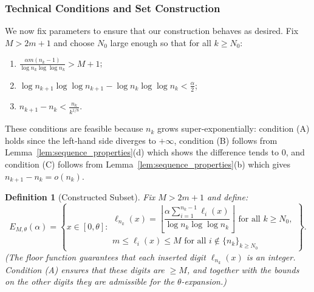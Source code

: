 \documentclass{article}
\newtheorem{definition}[theorem]{Definition}
\numberwithin{equation}{section}
\begin{document}
\subsubsection{Technical Conditions and Set Construction}
We now fix parameters to ensure that our construction behaves as desired. 
Fix $M > 2m+1$ and choose $N_0$ large enough so that for all $k \geq N_0$:
\begin{enumerate}
\item[(A)] $\displaystyle \frac{\alpha m(n_k - 1)}{\log n_k \log \log n_k} > M + 1$;
\item[(B)] $\displaystyle \log n_{k+1} \log \log n_{k+1} - \log n_k \log \log n_k < \frac{\alpha}{2}$;
\item[(C)] $\displaystyle n_{k+1} - n_k < \frac{n_k}{k^{1/8}}$.
\end{enumerate}
%
{These conditions are feasible because $n_k$ grows super‑exponentially: condition (A) holds since the left‑hand side diverges to $+\infty$, condition (B) follows from Lemma~\ref{lem:sequence_properties}(d) which shows the difference tends to $0$, and condition (C) follows from Lemma~\ref{lem:sequence_properties}(b) which gives $n_{k+1}-n_k = o(n_k)$.
}

\begin{definition}[Constructed Subset]
Fix $M > 2m+1$ and define:
\[
E_{M,\theta}(\alpha) = \left\{ x \in [0, \theta] : 
\begin{array}{l}
\ell_{n_k}(x) = \left\lfloor \dfrac{\alpha \sum_{i=1}^{n_k-1} \ell_i(x)}{\log n_k \log \log n_k} \right\rfloor \text{ for all } k \geq N_0, \\
m \leq \ell_i(x) \leq M \text{ for all } i \notin \{n_k\}_{k \geq N_0}
\end{array}
\right\}.
\]
{(The floor function guarantees that each inserted digit $\ell_{n_k}(x)$ is an integer. Condition (A) ensures that these digits are $\ge M$, and together with the bounds on the other digits they are admissible for the $\theta$-expansion.)
}
\end{definition} 
\end{document}
